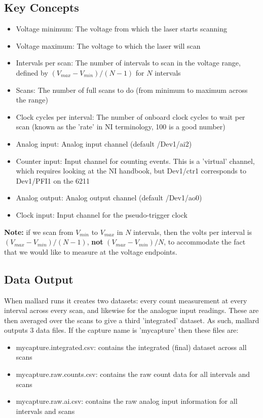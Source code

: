 \documentclass[10pt,a4paper]{article}
\begin{document}
\subsection{Key Concepts}
\begin{itemize}
\item Voltage minimum: The voltage from which the laser starts scanning
\item Voltage maximum: The voltage to which the laser will scan
\item Intervals per scan: The number of intervals to scan in the voltage range, defined by $(V_{max} - V_{min})/(N-1)$ for $N$ intervals
\item Scans: The number of full scans to do (from minimum to maximum across the range)
\item Clock cycles per interval: The number of onboard clock cycles to wait per scan (known as the 'rate' in NI terminology, 100 is a good number)
\item Analog input: Analog input channel (default /Dev1/ai2)
\item Counter input: Input channel for counting events. This is a 'virtual' channel, which requires looking at the NI handbook, but Dev1/ctr1 corresponds to Dev1/PFI1 on the 6211
\item Analog output: Analog output channel (default /Dev1/ao0)
\item Clock input: Input channel for the pseudo-trigger clock
\end{itemize}
\textbf{Note:} if we scan from $V_{min}$ to $V_{max}$ in $N$ intervals, then the volts per interval is $(V_{max} - V_{min})/(N-1)$, \textbf{not} $(V_{max} - V_{min})/N$, to accommodate the fact that we would like to measure at the voltage endpoints.

\subsection{Data Output}
When mallard runs it creates two datasets: every count measurement at every interval across every scan, and likewise for the analogue input readings. These are then averaged over the scans to give a third 'integrated' dataset. As such, mallard outputs 3 data files. If the capture name is 'mycapture' then these files are:

\begin{itemize}
\item mycapture.integrated.csv: contains the integrated (final) dataset across all scans
\item mycapture.raw.counts.csv: contains the raw count data for all intervals and scans
\item mycapture.raw.ai.csv: contains the raw analog input information for all intervals and scans
\end{itemize}
\end{document}
